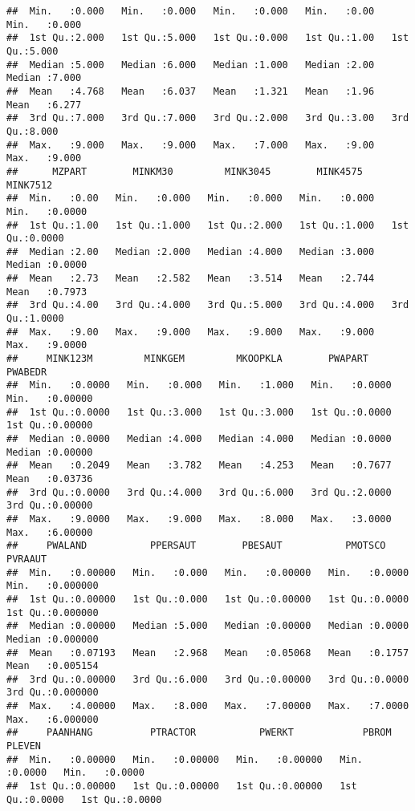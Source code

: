 \documentclass{article}\usepackage[]{graphicx}\usepackage[]{xcolor}
\makeatletter
\newenvironment{kframe}{%
 \def\at@end@of@kframe{}%
 \ifinner\ifhmode%
  \def\at@end@of@kframe{\end{minipage}}%
  \begin{minipage}{\columnwidth}%
 \fi\fi%
 \def\FrameCommand##1{\hskip\@totalleftmargin \hskip-\fboxsep
 \colorbox{shadecolor}{##1}\hskip-\fboxsep
     \hskip-\linewidth \hskip-\@totalleftmargin \hskip\columnwidth}%
 \MakeFramed {\advance\hsize-\width
   \@totalleftmargin\z@ \linewidth\hsize
   \@setminipage}}%
 {\par\unskip\endMakeFramed%
 \at@end@of@kframe}
\newenvironment{knitrout}{}{} %
\makeatother
\begin{document}
\begin{knitrout}
\begin{kframe}
\begin{verbatim}
##  Min.   :0.000   Min.   :0.000   Min.   :0.000   Min.   :0.00   Min.   :0.000  
##  1st Qu.:2.000   1st Qu.:5.000   1st Qu.:0.000   1st Qu.:1.00   1st Qu.:5.000  
##  Median :5.000   Median :6.000   Median :1.000   Median :2.00   Median :7.000  
##  Mean   :4.768   Mean   :6.037   Mean   :1.321   Mean   :1.96   Mean   :6.277  
##  3rd Qu.:7.000   3rd Qu.:7.000   3rd Qu.:2.000   3rd Qu.:3.00   3rd Qu.:8.000  
##  Max.   :9.000   Max.   :9.000   Max.   :7.000   Max.   :9.00   Max.   :9.000  
##      MZPART        MINKM30         MINK3045        MINK4575        MINK7512     
##  Min.   :0.00   Min.   :0.000   Min.   :0.000   Min.   :0.000   Min.   :0.0000  
##  1st Qu.:1.00   1st Qu.:1.000   1st Qu.:2.000   1st Qu.:1.000   1st Qu.:0.0000  
##  Median :2.00   Median :2.000   Median :4.000   Median :3.000   Median :0.0000  
##  Mean   :2.73   Mean   :2.582   Mean   :3.514   Mean   :2.744   Mean   :0.7973  
##  3rd Qu.:4.00   3rd Qu.:4.000   3rd Qu.:5.000   3rd Qu.:4.000   3rd Qu.:1.0000  
##  Max.   :9.00   Max.   :9.000   Max.   :9.000   Max.   :9.000   Max.   :9.0000  
##     MINK123M         MINKGEM         MKOOPKLA        PWAPART          PWABEDR       
##  Min.   :0.0000   Min.   :0.000   Min.   :1.000   Min.   :0.0000   Min.   :0.00000  
##  1st Qu.:0.0000   1st Qu.:3.000   1st Qu.:3.000   1st Qu.:0.0000   1st Qu.:0.00000  
##  Median :0.0000   Median :4.000   Median :4.000   Median :0.0000   Median :0.00000  
##  Mean   :0.2049   Mean   :3.782   Mean   :4.253   Mean   :0.7677   Mean   :0.03736  
##  3rd Qu.:0.0000   3rd Qu.:4.000   3rd Qu.:6.000   3rd Qu.:2.0000   3rd Qu.:0.00000  
##  Max.   :9.0000   Max.   :9.000   Max.   :8.000   Max.   :3.0000   Max.   :6.00000  
##     PWALAND           PPERSAUT        PBESAUT           PMOTSCO          PVRAAUT        
##  Min.   :0.00000   Min.   :0.000   Min.   :0.00000   Min.   :0.0000   Min.   :0.000000  
##  1st Qu.:0.00000   1st Qu.:0.000   1st Qu.:0.00000   1st Qu.:0.0000   1st Qu.:0.000000  
##  Median :0.00000   Median :5.000   Median :0.00000   Median :0.0000   Median :0.000000  
##  Mean   :0.07193   Mean   :2.968   Mean   :0.05068   Mean   :0.1757   Mean   :0.005154  
##  3rd Qu.:0.00000   3rd Qu.:6.000   3rd Qu.:0.00000   3rd Qu.:0.0000   3rd Qu.:0.000000  
##  Max.   :4.00000   Max.   :8.000   Max.   :7.00000   Max.   :7.0000   Max.   :6.000000  
##     PAANHANG          PTRACTOR           PWERKT            PBROM            PLEVEN      
##  Min.   :0.00000   Min.   :0.00000   Min.   :0.00000   Min.   :0.0000   Min.   :0.0000  
##  1st Qu.:0.00000   1st Qu.:0.00000   1st Qu.:0.00000   1st Qu.:0.0000   1st Qu.:0.0000  

\end{verbatim}
\end{kframe}
\end{knitrout}
\end{document}
